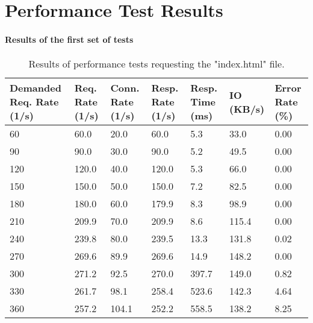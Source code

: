 \chapter{Performance Test Results}

\subsubsection{Results of the first set of tests}

\begin{table}[H]
  \centering
    \begin{tabular}{|m{2.5cm}|m{2cm}|m{2cm}|m{2cm}|m{2cm}|m{2cm}|m{2cm}|}
    \hline
    \textbf{Demanded Req. Rate} (1/s) & \textbf{Req. Rate} (1/s) & \textbf{Conn. Rate} (1/s) & \textbf{Resp. Rate} (1/s) & \textbf{Resp. Time} (ms) & \textbf{IO} (KB/s) & \textbf{Error Rate} (\%) \\
    \hline
    60 & 60.0 & 20.0 & 60.0 & 5.3 & 33.0 & 0.00 \\
    90 & 90.0 & 30.0 & 90.0 & 5.2 & 49.5 & 0.00 \\
    120 & 120.0 & 40.0 & 120.0 & 5.3 & 66.0 & 0.00 \\
    150 & 150.0 & 50.0 & 150.0 & 7.2 & 82.5 & 0.00 \\
    180 & 180.0 & 60.0 & 179.9 & 8.3 & 98.9 & 0.00 \\
    210 & 209.9 & 70.0 & 209.9 & 8.6 & 115.4 & 0.00 \\
    240 & 239.8 & 80.0 & 239.5 & 13.3 & 131.8 & 0.02 \\
    270 & 269.6 & 89.9 & 269.6 & 14.9 & 148.2 & 0.00 \\
    300 & 271.2 & 92.5 & 270.0 & 397.7 & 149.0 & 0.82 \\
    330 & 261.7 & 98.1 & 258.4 & 523.6 & 142.3 & 4.64 \\
    360 & 257.2 & 104.1 & 252.2 & 558.5 & 138.2 & 8.25 \\
    \hline
    \end{tabular}
  \caption{Results of performance tests requesting the "index.html" file.}
  \label{tab:perf-res-index}
\end{table}
\hspace{2cm}

